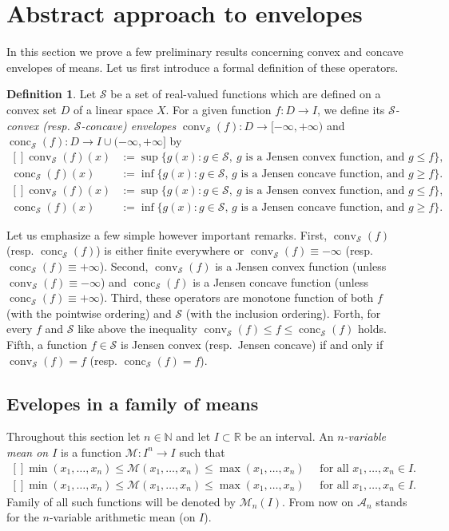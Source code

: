 \documentclass[12pt,oneside]{amsart}
\theoremstyle{definition}
\newtheorem{defin}[thm]{Definition}
\numberwithin{equation}{section}
\def\Eq#1#2{\ifthenelse{\equal{#1}{*}}
  {\begin{equation*}\begin{aligned}[]#2\end{aligned}\end{equation*}}
  {\begin{equation}\begin{aligned}[]\label{#1}#2\end{aligned}\end{equation}}}
\def\A{\mathscr{A}}
\def\M{\mathscr{M}}
\def\S{\mathcal{S}}
\def\calM{\mathcal{M}}
\newcommand\R{\mathbb{R}}
\newcommand\N{\mathbb{N}}
\DeclareMathOperator{\conv}{conv}
\DeclareMathOperator{\conc}{conc}
\begin{document}
\section{\label{sec:aa} Abstract approach to envelopes}


In this section we prove a few preliminary results concerning convex and concave envelopes of means. Let us first introduce a formal definition of these operators.
\begin{defin}
Let $\S$ be a set of real-valued functions which are defined on a convex set $D$ of a linear space $X$. For a given function $f \colon D \to I$, we define its \emph{$\S$-convex (resp. $\S$-concave) envelopes} $\conv_\S(f)\colon D \to [-\infty,+\infty)$ and $\conc_\S(f) \colon D \to I \cup (-\infty,+\infty]$ by
\Eq{*}{
\conv_\S(f)(x)&:=\sup \{g(x) \colon g \in \S, \ g \text{ is a Jensen convex function, and }g \le f \},\\
\conc_\S(f)(x)&:=\inf \{g(x) \colon g \in \S,\, g \text{ is a Jensen concave function, and }g \ge f \}.
}
\end{defin}

Let us emphasize a few simple however important remarks. First, $\conv_\S(f)$ (resp. $\conc_\S(f)$) is either finite everywhere or $\conv_\S(f)\equiv-\infty$ (resp. $\conc_\S(f)\equiv+\infty$). 
Second, $\conv_\S(f)$ is a Jensen convex function (unless $\conv_\S(f) \equiv -\infty$) and $\conc_\S(f)$ is a Jensen concave function (unless $\conc_\S(f) \equiv +\infty$). 
Third, these operators are monotone function of both $f$ (with the pointwise ordering) and $\S$ (with the inclusion ordering). Forth, for every $f$ and $\S$ like above the inequality $\conv_\S(f) \le f \le \conc_\S(f)$ holds.
Fifth, a function $f \in \S$ is Jensen convex (resp.\ Jensen concave) if and only if $\conv_\S(f)= f$ (resp. $\conc_\S(f)= f$). 

\subsection{Evelopes in a family of means}

Throughout this section let $n \in \N$ and let $I \subset \R$ be an interval. An \emph{$n$-variable mean on $I$} is a function $\M \colon I^n \to I$ such that
\Eq{*}{
\min(x_1,\dots,x_n)\le \M(x_1,\dots,x_n) \le \max(x_1,\dots,x_n) \quad\text{ for all }x_1,\dots,x_n \in I.
}
Family of all such functions will be denoted by $\calM_n(I)$. From now on $\A_n$ stands for the $n$-variable arithmetic mean (on $I$).
\end{document}
